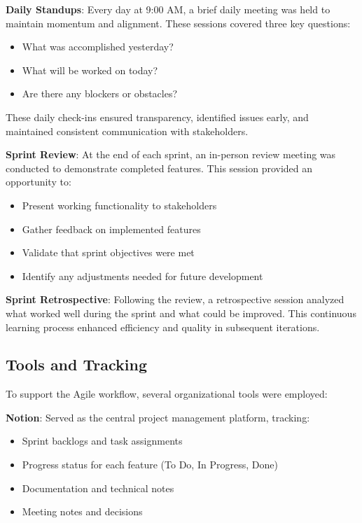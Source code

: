 \textbf{Daily Standups}: Every day at 9:00 AM, a brief daily meeting was held to maintain momentum and alignment. These sessions covered three key questions:
\begin{itemize}
    \item What was accomplished yesterday?
    \item What will be worked on today?
    \item Are there any blockers or obstacles?
\end{itemize}

These daily check-ins ensured transparency, identified issues early, and maintained consistent communication with stakeholders.

\textbf{Sprint Review}: At the end of each sprint, an in-person review meeting was conducted to demonstrate completed features. This session provided an opportunity to:
\begin{itemize}
    \item Present working functionality to stakeholders
    \item Gather feedback on implemented features
    \item Validate that sprint objectives were met
    \item Identify any adjustments needed for future development
\end{itemize}

\textbf{Sprint Retrospective}: Following the review, a retrospective session analyzed what worked well during the sprint and what could be improved. This continuous learning process enhanced efficiency and quality in subsequent iterations.

\subsection{Tools and Tracking}

To support the Agile workflow, several organizational tools were employed:

\textbf{Notion}: Served as the central project management platform, tracking:
\begin{itemize}
    \item Sprint backlogs and task assignments
    \item Progress status for each feature (To Do, In Progress, Done)
    \item Documentation and technical notes
    \item Meeting notes and decisions
\end{itemize}

